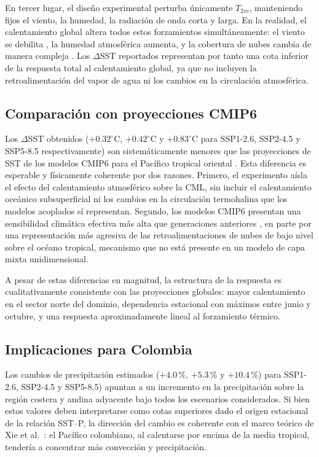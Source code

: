 \documentclass[12pt, a4paper]{article}
\begin{document}
En tercer lugar, el dise\~no experimental perturba \'unicamente $T_{2m}$, manteniendo 
fijos el viento, la humedad, la radiaci\'on de onda corta y larga. En la realidad, 
el calentamiento global altera todos estos forzamientos simult\'aneamente: el viento 
se debilita \cite{VecchiSoden2007}, la humedad atmosf\'erica aumenta, y la cobertura 
de nubes cambia de manera compleja \cite{Zelinka2020}. Los $\Delta$SST reportados 
representan por tanto una cota inferior de la respuesta total al calentamiento global, 
ya que no incluyen la retroalimentaci\'on del vapor de agua ni los cambios en la 
circulaci\'on atmosf\'erica.

\subsection{Comparaci\'on con proyecciones CMIP6}

Los $\Delta$SST obtenidos ($+0.32^{\circ}$C, $+0.42^{\circ}$C y $+0.83^{\circ}$C 
para SSP1-2.6, SSP2-4.5 y SSP5-8.5 respectivamente) son sistem\'aticamente menores 
que las proyecciones de SST de los modelos CMIP6 para el Pac\'ifico tropical oriental 
\cite{Eyring2016}. Esta diferencia es esperable y f\'isicamente coherente por dos 
razones. Primero, el experimento a\'isla el efecto del calentamiento atmosf\'erico 
sobre la CML, sin incluir el calentamiento oce\'anico subsuperficial ni los cambios 
en la circulaci\'on termohalina que los modelos acoplados s\'i representan. Segundo, 
los modelos CMIP6 presentan una sensibilidad clim\'atica efectiva m\'as alta que 
generaciones anteriores \cite{Zelinka2020}, en parte por una representaci\'on m\'as 
agresiva de las retroalimentaciones de nubes de bajo nivel sobre el oc\'eano tropical, 
mecanismo que no est\'a presente en un modelo de capa mixta unidimensional.

A pesar de estas diferencias en magnitud, la estructura de la respuesta es cualitativamente 
consistente con las proyecciones globales: mayor calentamiento en el sector norte del 
dominio, dependencia estacional con m\'aximos entre junio y octubre, y una respuesta 
aproximadamente lineal al forzamiento t\'ermico.

\subsection{Implicaciones para Colombia}

Los cambios de precipitaci\'on estimados ($+4.0$\,\%, $+5.3$\,\% y $+10.4$\,\%) para 
SSP1-2.6, SSP2-4.5 y SSP5-8.5) apuntan a un incremento en la precipitaci\'on sobre 
la regi\'on costera y andina adyacente bajo todos los escenarios considerados. Si bien 
estos valores deben interpretarse como cotas superiores dado el origen estacional de 
la relaci\'on SST--P, la direcci\'on del cambio es coherente con el marco te\'orico de 
Xie et al.\ \cite{Xie2010}: el Pac\'ifico colombiano, al calentarse por encima de la 
media tropical, tender\'ia a concentrar m\'as convecci\'on y precipitaci\'on. 
\end{document}
